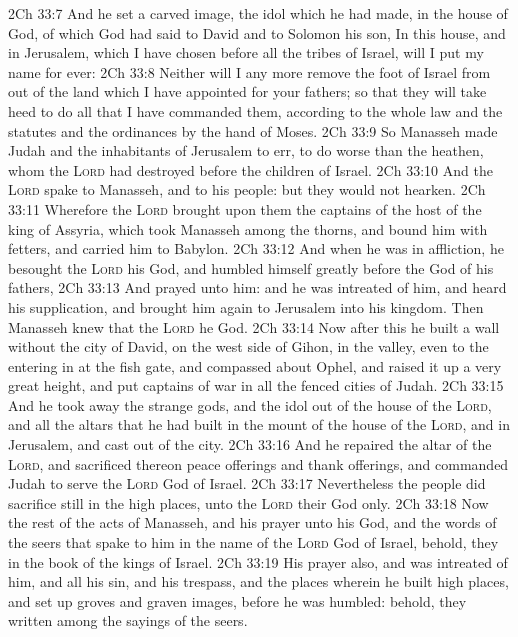 \vs 2Ch 33:7 And he set a carved image, the idol which he had made, in the house of God, of which God had said to David and to Solomon his son, In this house, and in Jerusalem, which I have chosen before all the tribes of Israel, will I put my name for ever:
\vs 2Ch 33:8 Neither will I any more remove the foot of Israel from out of the land which I have appointed for your fathers; so that they will take heed to do all that I have commanded them, according to the whole law and the statutes and the ordinances by the hand of Moses.
\vs 2Ch 33:9 So Manasseh made Judah and the inhabitants of Jerusalem to err,  to do worse than the heathen, whom the \textsc{Lord} had destroyed before the children of Israel.
\vs 2Ch 33:10 And the \textsc{Lord} spake to Manasseh, and to his people: but they would not hearken.
\vs 2Ch 33:11 Wherefore the \textsc{Lord} brought upon them the captains of the host of the king of Assyria, which took Manasseh among the thorns, and bound him with fetters, and carried him to Babylon.
\vs 2Ch 33:12 And when he was in affliction, he besought the \textsc{Lord} his God, and humbled himself greatly before the God of his fathers,
\vs 2Ch 33:13 And prayed unto him: and he was intreated of him, and heard his supplication, and brought him again to Jerusalem into his kingdom. Then Manasseh knew that the \textsc{Lord} he  God.
\vs 2Ch 33:14 Now after this he built a wall without the city of David, on the west side of Gihon, in the valley, even to the entering in at the fish gate, and compassed about Ophel, and raised it up a very great height, and put captains of war in all the fenced cities of Judah.
\vs 2Ch 33:15 And he took away the strange gods, and the idol out of the house of the \textsc{Lord}, and all the altars that he had built in the mount of the house of the \textsc{Lord}, and in Jerusalem, and cast  out of the city.
\vs 2Ch 33:16 And he repaired the altar of the \textsc{Lord}, and sacrificed thereon peace offerings and thank offerings, and commanded Judah to serve the \textsc{Lord} God of Israel.
\vs 2Ch 33:17 Nevertheless the people did sacrifice still in the high places,  unto the \textsc{Lord} their God only.
\vs 2Ch 33:18 Now the rest of the acts of Manasseh, and his prayer unto his God, and the words of the seers that spake to him in the name of the \textsc{Lord} God of Israel, behold, they  in the book of the kings of Israel.
\vs 2Ch 33:19 His prayer also, and  was intreated of him, and all his sin, and his trespass, and the places wherein he built high places, and set up groves and graven images, before he was humbled: behold, they  written among the sayings of the seers.
